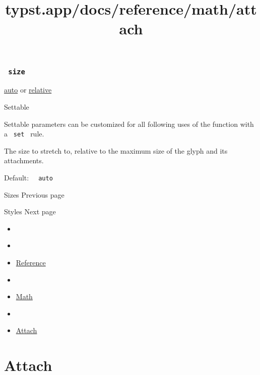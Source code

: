\subsubsection{\texorpdfstring{\texttt{\ size\ }}{ size }}\label{parameters-size}

\href{/docs/reference/foundations/auto/}{auto} {or}
\href{/docs/reference/layout/relative/}{relative}

{{ Settable }}

\label{parameters-size-settable-tooltip}
Settable parameters can be customized for all following uses of the
function with a \texttt{\ set\ } rule.

The size to stretch to, relative to the maximum size of the glyph and
its attachments.

Default: \texttt{\ }{\texttt{\ auto\ }}\texttt{\ }

\href{/docs/reference/math/sizes/}{\pandocbounded{}}

{ Sizes } { Previous page }

\href{/docs/reference/math/styles/}{\pandocbounded{}}

{ Styles } { Next page }


\title{typst.app/docs/reference/math/attach}

\begin{itemize}
\tightlist
\item
  \href{/docs}{}
\item
  
\item
  \href{/docs/reference/}{Reference}
\item
  
\item
  \href{/docs/reference/math/}{Math}
\item
  
\item
  \href{/docs/reference/math/attach}{Attach}
\end{itemize}

\section{Attach}\label{summary}

